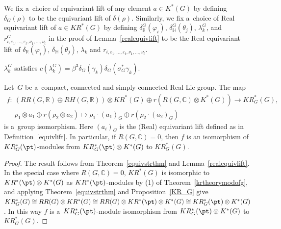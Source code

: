\begin{Definition}
\label{equivlift}
We f\/ix a~choice of equivariant lift of any element $a\in K^*(G)$ by def\/ining $\delta_G(\rho)$ to be the equivariant lift
of $\delta(\rho)$.
Similarly, we f\/ix a~choice of Real equivariant lift of $a\in KR^*(G)$ by def\/ining $\delta_\mathbb{R}^G(\varphi_i)$,
$\delta_\mathbb{H}^G(\theta_j)$, $\lambda_k^G$, and $r^G_{i, \varepsilon_1, \dots, \varepsilon_t, \nu_1, \dots, \nu_t}$
in the proof of Lemma~\ref{realequivlift} to be the Real equivariant lift of $\delta_\mathbb{R}(\varphi_i)$,
$\delta_\mathbb{H}(\theta_j)$, $\lambda_k$ and $r_{i, \varepsilon_1, \dots, \varepsilon_t, \nu_1, \dots, \nu_t}$.
\end{Definition}
\begin{Remark}
\label{cplxeqsquare}
$\lambda^G_k$ satisf\/ies $c(\lambda^G_k)=\beta^3\delta_G(\gamma_k)\delta_G(\overline{\sigma_G^*}
\gamma_k)$.
\end{Remark}
\begin{Corollary}
\label{equivstrthmg}
Let~$G$ be a~compact, connected and simply-connected Real Lie group.
The map
\begin{gather*}
f: \ (RR(G, \mathbb{R})\oplus RH(G, \mathbb{R}))\otimes KR^*(G)\oplus r(R(G, \mathbb{C})\otimes K^*(G))  \to  KR_G^*(G),
\\
\phantom{f: {}} \
\rho_1\otimes a_1\oplus r(\rho_2\otimes a_2)  \mapsto  \rho_1\cdot (a_1)_{G}\oplus r(\rho_2\cdot (a_2)_G)
\end{gather*}
is a~group isomorphism.
Here $(a_i)_G$ is the $($Real$)$ equivariant lift defined as in Definition~{\rm \ref{equivlift}}.
In particular, if $R(G, \mathbb{C})=0$, then $f$ is an isomorphism of $KR^*_{G}(\pt)$-modules from
$KR_G^*(\pt)\otimes K^*(G)$ to $KR_G^*(G)$.
\end{Corollary}
\begin{proof}
The result follows from Theorem~\ref{equivstrthm} and Lemma~\ref{realequivlift}.
In the special case where $R(G, \mathbb{C})=0$, $KR^*(G)$ is isomorphic to $KR^*(\pt)\otimes K^*(G)$ as
$KR^*(\pt)$-modules by (1) of Theorem~\ref{krtheorymodofg}, and applying Theorem~\ref{equivstrthm} and
Proposition~\ref{KR_G} give $KR^*_G(G)\cong RR(G)\otimes KR^*(G)\cong RR(G)\otimes KR^*(\pt)\otimes K^*(G)\cong
KR^*_G(\pt)\otimes K^*(G)$.
In this way $f$ is a~$KR_G^*(\pt)$-module isomorphism from $KR_G^*(\pt)\otimes K^*(G)$ to $KR_G^*(G)$.
\end{proof}
